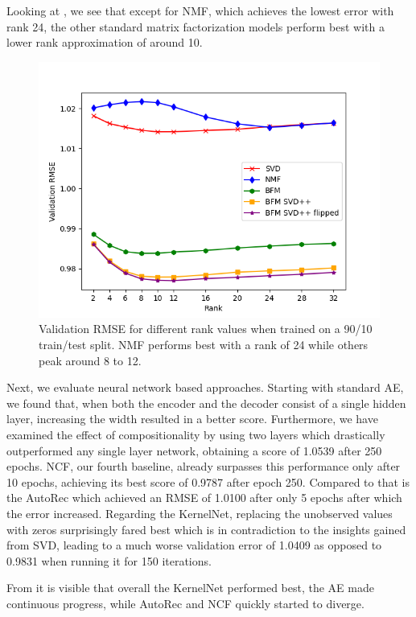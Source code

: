 \documentclass[10pt,conference,compsocconf]{IEEEtran}
\begin{document}
    Looking at , we see that except for NMF, which achieves the lowest error with rank 24, the other standard matrix factorization models perform best with a lower rank approximation of around 10.
    \begin{figure}
        \includegraphics[width=\columnwidth]{figures/rank.png}
        \caption{Validation RMSE for different rank values when trained on a 90/10 train/test split.
        NMF performs best with a rank of 24 while others peak around 8 to 12.}
        \label{fig:rank}
    \end{figure}

    Next, we evaluate neural network based approaches.
    Starting with standard AE, we found that, when both the encoder and the decoder consist of a single hidden layer, increasing the width resulted in a better score.
    Furthermore, we have examined the effect of compositionality by using two layers which drastically outperformed any single layer network, obtaining a score of 1.0539 after 250 epochs.
    NCF, our fourth baseline, already surpasses this performance only after 10 epochs, achieving its best score of 0.9787 after epoch 250.
    Compared to that is the AutoRec which achieved an RMSE of 1.0100 after only 5 epochs after which the error increased.
    Regarding the KernelNet, replacing the unobserved values with zeros surprisingly fared best which is in contradiction to the insights gained from SVD, leading to a much worse validation error of 1.0409 as opposed to 0.9831 when running it for 150 iterations.

    From  it is visible that overall the KernelNet performed best, the AE made continuous progress, while AutoRec and NCF quickly started to diverge.
\end{document}

